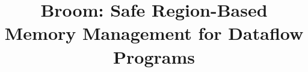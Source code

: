 \documentclass[10pt,pldi]{sigplanconf}
\begin{document}




\title{Broom: Safe Region-Based Memory Management for Dataflow
Programs}

\authorinfo{}
           {}
           {}
\maketitle

\begin{abstract}

\end{abstract}
















\end{document}
